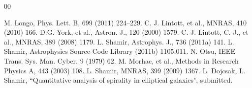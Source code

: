 \documentclass[times,twocolumn]{article}
\begin{document}

\begin{thebibliography}{00}


%
M. Longo, Phys. Lett. B, 699 (2011) 224--229.
%
C. J. Lintott, et al., MNRAS, 410 (2010) 166.
%
D.G. York, et al., Astron. J., 120 (2000) 1579.
%
C. J. Lintott, C. J., et al., MNRAS, 389 (2008) 1179.
%
L. Shamir, Astrophys. J., 736 (2011a) 141.
%
L. Shamir, Astrophysics Source Code Library (2011b) 1105.011.
%
N. Otsu, IEEE Trans. Sys. Man. Cyber. 9 (1979) 62.
%
M. Morhac, et al., Methods in Research Physics A, 443 (2003) 108.
%
L. Shamir, MNRAS, 399 (2009) 1367.
%
L. Dojcsak, L. Shamir, ``Quantitative analysis of spirality in elliptical galaxies", submitted.
%
%
\end{thebibliography}
\end{document}
